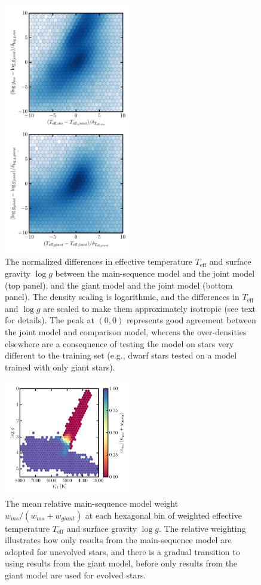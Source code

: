 \documentclass[preprint,trackchanges]{aastex}
\newcommand{\teff}{T_{\mathrm{eff}}}
\newcommand{\logg}{\log g}
\begin{document}
\begin{figure}[p]
\center
\includegraphics[width=0.5\textwidth]{figures/joint-model-differences.pdf}
\caption{The normalized differences in effective temperature $\teff$ and surface gravity $\logg$ between the main-sequence model and the joint model (top panel), and the giant model and the joint model (bottom panel).  The density scaling is logarithmic, and the differences in $\teff$ and $\logg$ are scaled to make them approximately isotropic (see text for details).  The peak at $(0, 0)$ represents good agreement between the joint model and comparison model, whereas the over-densities elsewhere are a consequence of testing the model on stars very different to the training set (e.g., dwarf stars tested on a model trained with only giant stars).\label{fig:joint-model-differences}}
\end{figure}


\begin{figure}[p]
\center
\includegraphics[width=0.5\textwidth]{figures/model-weights.pdf}
\caption{The mean relative main-sequence model weight $w_{ms}/(w_{ms} + w_{giant})$ at each hexagonal bin of weighted effective temperature $\teff$ and surface gravity $\logg$.  The relative weighting illustrates how only results from the main-sequence model are adopted for unevolved stars, and there is a gradual transition to using results from the giant model, before only results from the giant model are used for evolved stars.\label{fig:model-weights}}
\end{figure}
\end{document}
